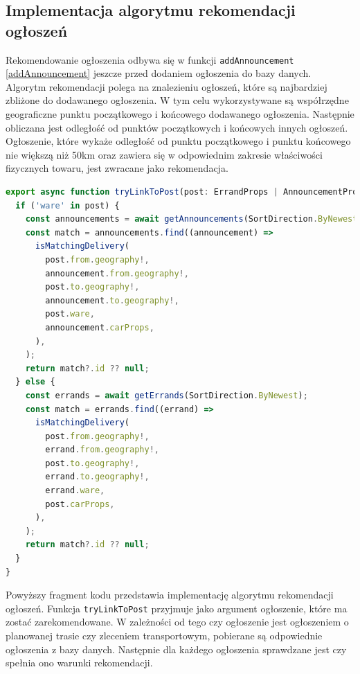 \pagebreak
\subsection{Implementacja algorytmu rekomendacji ogłoszeń}

Rekomendowanie ogłoszenia odbywa się w funkcji \texttt{addAnnouncement} \ref{addAnnouncement} jeszcze przed dodaniem ogłoszenia do bazy danych. Algorytm rekomendacji polega na znalezieniu ogłoszeń, które są najbardziej zbliżone do dodawanego ogłoszenia. W tym celu wykorzystywane są współrzędne geograficzne punktu początkowego i końcowego dodawanego ogłoszenia. Następnie obliczana jest odległość od punktów początkowych i końcowych innych ogłoszeń. Ogłoszenie, które wykaże odległość od punktu początkowego i punktu końcowego nie większą niż 50km oraz zawiera się w odpowiednim zakresie właściwości fizycznych towaru, jest zwracane jako rekomendacja.

{\belowcaptionskip=-9pt
\begin{lstlisting}[language=JavaScript,caption=Implementacja rekomendacji ogłoszeń, label=lst:recomendPost]
  export async function tryLinkToPost(post: ErrandProps | AnnouncementProps): Promise<string | null> {
  if ('ware' in post) {
    const announcements = await getAnnouncements(SortDirection.ByNewest);
    const match = announcements.find((announcement) =>
      isMatchingDelivery(
        post.from.geography!,
        announcement.from.geography!,
        post.to.geography!,
        announcement.to.geography!,
        post.ware,
        announcement.carProps,
      ),
    );
    return match?.id ?? null;
  } else {
    const errands = await getErrands(SortDirection.ByNewest);
    const match = errands.find((errand) =>
      isMatchingDelivery(
        post.from.geography!,
        errand.from.geography!,
        post.to.geography!,
        errand.to.geography!,
        errand.ware,
        post.carProps,
      ),
    );
    return match?.id ?? null;
  }
}
\end{lstlisting}
}

Powyższy fragment kodu przedstawia implementację algorytmu rekomendacji ogłoszeń. Funkcja \texttt{tryLinkToPost} przyjmuje jako argument ogłoszenie, które ma zostać zarekomendowane. W zależności od tego czy ogłoszenie jest ogłoszeniem o planowanej trasie czy zleceniem transportowym, pobierane są odpowiednie ogłoszenia z bazy danych. Następnie dla każdego ogłoszenia sprawdzane jest czy spełnia ono warunki rekomendacji.


